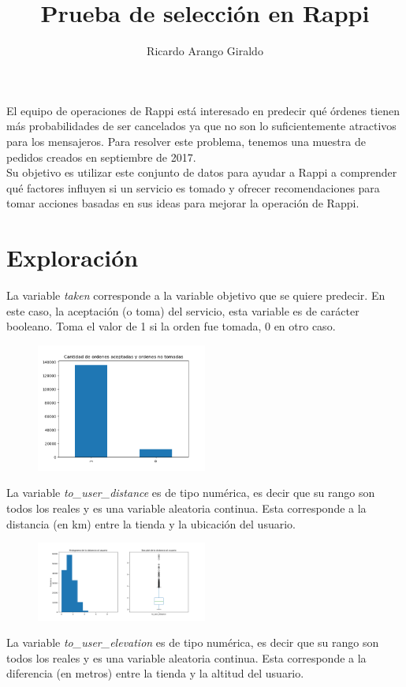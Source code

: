 \documentclass[10pt,a4paper]{article}
\author{Ricardo Arango Giraldo}
\title{Prueba de selección en Rappi}
\begin{document}
\maketitle
	El equipo de operaciones de Rappi está interesado en predecir qué órdenes tienen más probabilidades de ser cancelados ya que no son lo suficientemente atractivos para los mensajeros. Para resolver este problema, tenemos una muestra de pedidos creados en septiembre de 2017.\\
	Su objetivo es utilizar este conjunto de datos para ayudar a Rappi a comprender qué factores influyen si un servicio es tomado y ofrecer recomendaciones para tomar acciones basadas en sus ideas para mejorar la operación de Rappi.
	\section{Exploración}
		La variable \textit{taken} corresponde a la variable objetivo que se quiere predecir. En este caso, la aceptación (o toma) del servicio, esta variable es de carácter booleano. Toma el valor de 1 si la orden fue tomada, 0 en otro caso.\\
		
		\begin{figure}[h]
			\centering
			\includegraphics[width=0.5\textwidth]{../Img/Figure_1}
		\end{figure}
		La variable \textit{to\_user\_distance} es de tipo numérica, es decir que su rango son todos los reales y es una variable aleatoria continua. Esta corresponde a la distancia (en km) entre la tienda y la ubicación del usuario.\\
		
		\begin{figure}[h]
			\centering
			\includegraphics[width=0.5\textwidth]{../Img/to_user_distance}
		\end{figure}
		La variable \textit{to\_user\_elevation} es de tipo numérica, es decir que su rango son todos los reales y es una variable aleatoria continua. Esta corresponde a la diferencia (en metros) entre la tienda y la altitud del usuario.\\
				
\end{document}
